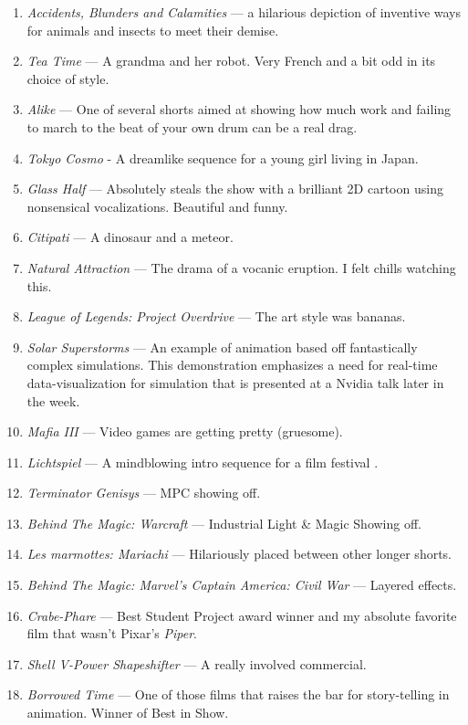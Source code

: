 \documentclass[../main.tex]{subfiles}
\begin{document}
\begin{enumerate}
	\item \textit{Accidents, Blunders and Calamities} --- a hilarious depiction of inventive ways for animals and insects to meet their demise.
	\item \textit{Tea Time} --- A grandma and her robot. Very French and a bit odd in its choice of style.
	\item \textit{Alike} --- One of several shorts aimed at showing how much work and failing to march to the beat of your own drum can be a real drag.
	\item \textit{Tokyo Cosmo} - A dreamlike sequence for a young girl living in Japan.
	\item \textit{Glass Half} --- Absolutely steals the show with a brilliant 2D cartoon using nonsensical vocalizations. Beautiful and funny.
	\item \textit{Citipati} --- A dinosaur and a meteor.
	\item \textit{Natural Attraction} --- The drama of a vocanic eruption. I felt chills watching this.
	\item \textit{League of Legends: Project Overdrive} --- The art style was bananas.
	\item \textit{Solar Superstorms} --- An example of animation based off fantastically complex simulations. This demonstration emphasizes a need for real-time data-visualization for simulation that is presented at a Nvidia talk later in the week.
	\item \textit{Mafia III} --- Video games are getting pretty (gruesome).
	\item \textit{Lichtspiel} --- A mindblowing intro sequence for a film festival .
	\item \textit{Terminator Genisys} --- MPC showing off.
	\item \textit{Behind The Magic: Warcraft} --- Industrial Light \& Magic Showing off.
	\item \textit{Les marmottes: Mariachi} --- Hilariously placed between other longer shorts.
	\item \textit{Behind The Magic: Marvel's Captain America: Civil War} --- Layered effects.
	\item \textit{Crabe-Phare} --- Best Student Project award winner and my absolute favorite film that wasn't Pixar's \textit{Piper}.
	\item \textit{Shell V-Power Shapeshifter} --- A really involved commercial.
	\item \textit{Borrowed Time} --- One of those films that raises the bar for story-telling in animation. Winner of Best in Show.

\end{enumerate}
\end{document}
